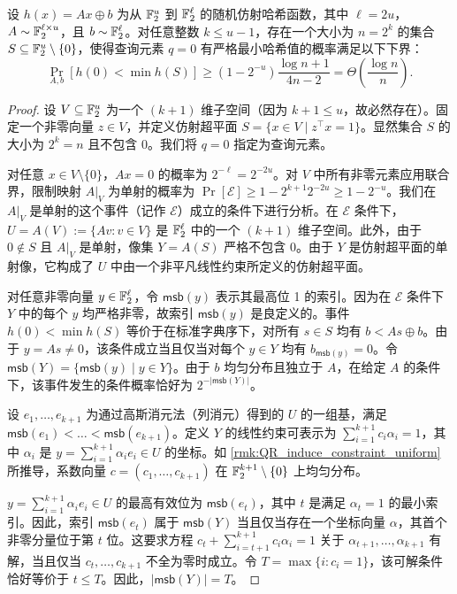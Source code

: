 \newcommand{\msb}{\mathsf{msb}}

\begin{theorem}\label{thm:min_wise_random_affine_not_good}
    设 $h(x) = Ax \oplus b$ 为从 $\mathbb{F}_2^u$ 到 $\mathbb{F}_2^\ell$ 的随机仿射哈希函数，其中 $\ell = 2u$，$A \sim \mathbb{F}_2^{\ell \times u}$，且 $b \sim \mathbb{F}_2^\ell$。对任意整数 $k \le u - 1$，存在一个大小为 $n = 2^k$ 的集合 $S \subseteq \mathbb{F}_2^u \setminus \{0\}$，使得查询元素 $q = 0$ 有严格最小哈希值的概率满足以下下界：
    $$
    \Pr_{A,b}[h(0) < \min h(S)] \ge (1 - 2^{-u}) \frac{\log n + 1}{4n - 2} = \Theta\left(\frac{\log n}{n}\right).
    $$
\end{theorem}

\begin{proof}
    设 $V \subseteq \mathbb{F}_2^u$ 为一个 $(k+1)$ 维子空间（因为 $k+1 \le u$，故必然存在）。固定一个非零向量 $z \in V$，并定义仿射超平面 $S = \{ x \in V \mid z^\top x = 1 \}$。显然集合 $S$ 的大小为 $2^k = n$ 且不包含 $0$。我们将 $q = 0$ 指定为查询元素。
    
    对任意 $x \in V \setminus \{0\}$，$Ax = 0$ 的概率为 $2^{-\ell} = 2^{-2u}$。对 $V$ 中所有非零元素应用联合界，限制映射 $A|_V$ 为单射的概率为 $\Pr[\mathcal{E}] \ge 1 - 2^{k+1} 2^{-2u} \ge 1 - 2^{-u}$。我们在 $A|_V$ 是单射的这个事件（记作 $\mathcal{E}$）成立的条件下进行分析。在 $\mathcal{E}$ 条件下，$U = A(V) := \{A v : v \in V\}$ 是 $\mathbb{F}_2^\ell$ 中的一个 $(k+1)$ 维子空间。此外，由于 $0 \notin S$ 且 $A|_V$ 是单射，像集 $Y = A(S)$ 严格不包含 $0$。由于 $Y$ 是仿射超平面的单射像，它构成了 $U$ 中由一个非平凡线性约束所定义的仿射超平面。
    
    对任意非零向量 $y \in \mathbb{F}_2^\ell$，令 $\msb(y)$ 表示其最高位 1 的索引。因为在 $\mathcal{E}$ 条件下 $Y$ 中的每个 $y$ 均严格非零，故索引 $\msb(y)$ 是良定义的。事件 $h(0) < \min h(S)$ 等价于在标准字典序下，对所有 $s \in S$ 均有 $b < As \oplus b$。由于 $y = As \neq 0$，该条件成立当且仅当对每个 $y \in Y$ 均有 $b_{\msb(y)} = 0$。令 $\msb(Y) = \{ \msb(y) \mid y \in Y \}$。由于 $b$ 均匀分布且独立于 $A$，在给定 $A$ 的条件下，该事件发生的条件概率恰好为 $2^{-|\msb(Y)|}$。
    
    设 $e_1, \dots, e_{k+1}$ 为通过高斯消元法（列消元）得到的 $U$ 的一组基，满足 $\msb(e_1) < \dots < \msb(e_{k+1})$。定义 $Y$ 的线性约束可表示为 $\sum_{i=1}^{k+1} c_i \alpha_i = 1$，其中 $\alpha_i$ 是 $y = \sum_{i=1}^{k+1} \alpha_i e_i \in U$ 的坐标。如 \cref{rmk:QR_induce_constraint_uniform} 所推导，系数向量 $c = (c_1, \dots, c_{k+1})$ 在 $\mathbb{F}_2^{k+1} \setminus \{0\}$ 上均匀分布。
    
    $y = \sum_{i = 1}^{k + 1} \alpha_i e_i \in U$ 的最高有效位为 $\msb(e_t)$，其中 $t$ 是满足 $\alpha_t = 1$ 的最小索引。因此，索引 $\msb(e_t)$ 属于 $\msb(Y)$ 当且仅当存在一个坐标向量 $\alpha$，其首个非零分量位于第 $t$ 位。这要求方程 $c_t + \sum_{i = t + 1}^{k + 1} c_i \alpha_i = 1$ 关于 $\alpha_{t + 1}, \dots, \alpha_{k + 1}$ 有解，当且仅当 $c_t, \dots, c_{k + 1}$ 不全为零时成立。令 $T = \max \{ i : c_i = 1 \}$，该可解条件恰好等价于 $t \le T$。因此，$|\msb(Y)| = T$。
    

\end{proof}
